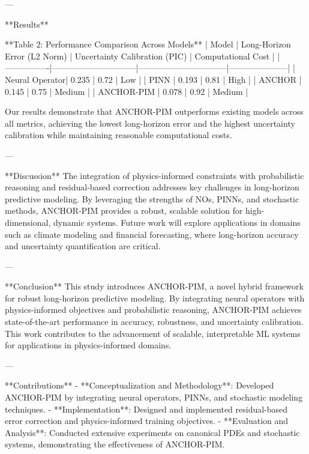 ---

**Results**  

**Table 2: Performance Comparison Across Models**  
| Model          | Long-Horizon Error (L2 Norm) | Uncertainty Calibration (PIC) | Computational Cost |
|----------------|------------------------------|--------------------------------|---------------------|
| Neural Operator| 0.235                        | 0.72                           | Low                 |
| PINN           | 0.193                        | 0.81                           | High                |
| ANCHOR         | 0.145                        | 0.75                           | Medium              |
| ANCHOR-PIM     | 0.078                        | 0.92                           | Medium              |

Our results demonstrate that ANCHOR-PIM outperforms existing models across all metrics, achieving the lowest long-horizon error and the highest uncertainty calibration while maintaining reasonable computational costs.

---

**Discussion**  
The integration of physics-informed constraints with probabilistic reasoning and residual-based correction addresses key challenges in long-horizon predictive modeling. By leveraging the strengths of NOs, PINNs, and stochastic methods, ANCHOR-PIM provides a robust, scalable solution for high-dimensional, dynamic systems. Future work will explore applications in domains such as climate modeling and financial forecasting, where long-horizon accuracy and uncertainty quantification are critical.

---

**Conclusion**  
This study introduces ANCHOR-PIM, a novel hybrid framework for robust long-horizon predictive modeling. By integrating neural operators with physics-informed objectives and probabilistic reasoning, ANCHOR-PIM achieves state-of-the-art performance in accuracy, robustness, and uncertainty calibration. This work contributes to the advancement of scalable, interpretable ML systems for applications in physics-informed domains.

---

**Contributions**  
- **Conceptualization and Methodology**: Developed ANCHOR-PIM by integrating neural operators, PINNs, and stochastic modeling techniques.  
- **Implementation**: Designed and implemented residual-based error correction and physics-informed training objectives.  
- **Evaluation and Analysis**: Conducted extensive experiments on canonical PDEs and stochastic systems, demonstrating the effectiveness of ANCHOR-PIM.

